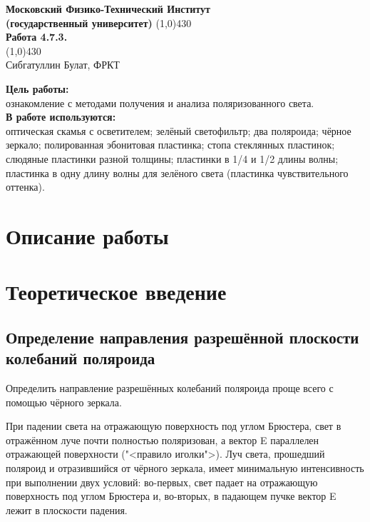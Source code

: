 \documentclass[a4paper, 12pt]{article}%
\begin{document}
\begin{titlepage}

\begin{center}
\large\textbf{Московский Физико-Технический Институт}\\
\large\textbf{(государственный университет)}
\vfill
\line(1,0){430}\\[1mm]
\huge\textbf{Работа 4.7.3.}\\
\line(1,0){430}\\[1mm]
\vfill
\large Сибгатуллин Булат, ФРКТ\\
\end{center}

\end{titlepage}
\noindent \textbf{Цель работы:} \\
\indent ознакомление с методами получения и анализа поляризованного света.\\
\noindent \textbf{В работе используются:} \\
\indent оптическая скамья с осветителем; зелёный светофильтр; два поляроида; чёрное зеркало; полированная эбонитовая пластинка; стопа стеклянных пластинок; слюдяные пластинки разной толщины; пластинки в 1/4 и 1/2 длины волны; пластинка в одну длину волны для зелёного света (пластинка чувствительного оттенка).

\section*{Описание работы}

\section{Теоретическое введение}
	
	\subsection{Определение направления разрешённой плоскости колебаний поляроида}
	
	Определить направление разрешённых колебаний поляроида проще всего с помощью чёрного зеркала.
	
При падении света на отражающую поверхность под углом Брюстера, свет в отражённом луче почти полностью поляризован, а вектор E
параллелен отражающей поверхности ("<правило иголки">). Луч света,
прошедший поляроид и отразившийся от чёрного зеркала, имеет минимальную интенсивность при выполнении двух условий: во-первых, свет
падает на отражающую поверхность под углом Брюстера и, во-вторых,
в падающем пучке вектор E лежит в плоскости падения.
\end{document}
